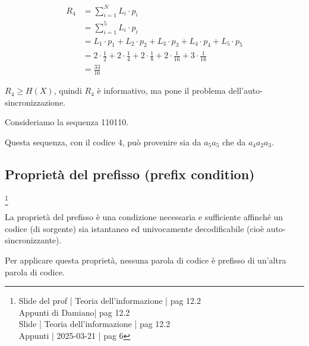 {
    \Large 
    \begin{equation}
        \begin{split}
            R_4
            &= 
            \sum_{i = 1}^{N}
            L_i \cdot p_i 
            \\
            &= 
            \sum_{i = 1}^{5}
            L_i \cdot p_i
            \\
            &= 
            L_1 \cdot p_1
            +
            L_2 \cdot p_2
            +
            L_3 \cdot p_3 
            + 
            L_4 \cdot p_4 
            + 
            L_5 \cdot p_5
            \\
            &= 
            2 \cdot \frac{1}{2}
            +
            2 \cdot \frac{1}{4}
            +
            2 \cdot \frac{1}{8} 
            + 
            2 \cdot \frac{1}{16} 
            + 
            3 \cdot \frac{1}{16}
            \\
            &= 
            \frac{33}{16}
        \end{split}
    \end{equation}
}

$R_4 \ge H(X)$, quindi $R_4$ è informativo, ma pone il problema dell'auto-sincronizzazione. \newline 

Consideriamo la sequenza 110110. \newline 

Questa sequenza, con il codice 4, può provenire sia da $a_5 a_5$ che da $a_4 a_2 a_3$. \newline 

\newpage 

\subsection{Proprietà del prefisso (prefix condition)}
\footnote{Slide del prof | Teoria dell'informazione | pag 12.2 \\  
Appunti di Damiano| pag 12.2 \\
Slide | Teoria dell'informazione | pag 12.2 \\
Appunti | 2025-03-21 | pag 6
}

La proprietà del prefisso è una condizione necessaria e sufficiente affinché un codice (di sorgente) sia istantaneo ed univocamente decodificabile
(cioè auto-sincronizzante). \newline 

Per applicare questa proprietà, nessuna parola di codice è prefisso di un'altra parola di codice. \newline 

